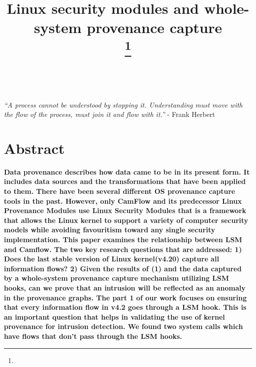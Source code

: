 \documentclass{IEEEtran}
\begin{document}
\title{Linux security modules and whole-system provenance capture\\
{\footnotesize}
\thanks{}
}

\author{ \\


}

\maketitle
 \textit{“A process cannot be understood by stopping it. Understanding must move with the flow of the process, must join it and flow with it.” } - Frank Herbert
\section*{Abstract}
    
     \vskip 0.2in
	 \textbf{Data provenance describes how data came to be in its present form. It includes data sources and the transformations that have been applied to them. There have been several different OS provenance capture tools in the past. However, only CamFlow and its predecessor Linux Provenance Modules use Linux Security Modules that is a  framework that allows the Linux kernel to support a variety of computer security models while avoiding favouritism toward any single security implementation. This paper examines the relationship between LSM and Camflow. The two key research questions that are addressed: 1) Does
	 the last stable version of Linux kernel(v4.20) capture all information flows? 2) Given the results of (1) and the data captured by a whole-system provenance capture mechanism utilizing LSM hooks, can we prove that an intrusion will be reflected as an anomaly in the provenance graphs. The part 1 of our work focuses on ensuring that every information flow  in v4.2 goes through a LSM hook. This is an important question that helps in validating the use of kernel provenance for intrusion detection. We found two system calls which have flows that don't pass through the LSM hooks. }









\end{document}

